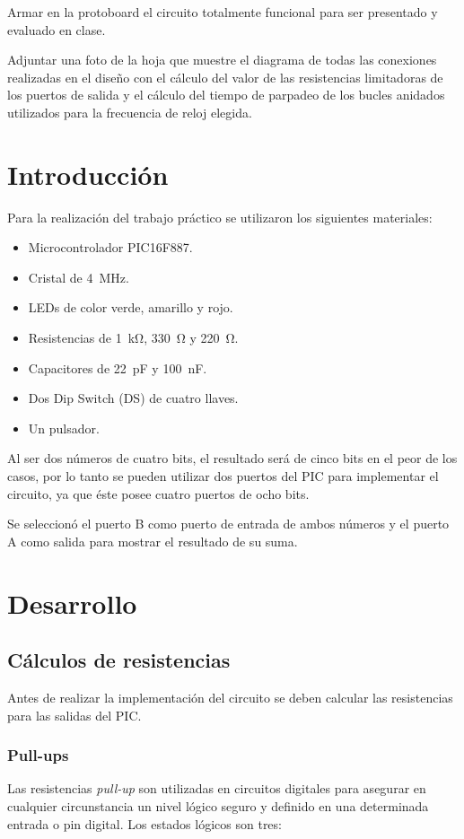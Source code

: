 \documentclass[12pt,a4paper]{article}
\begin{document}
	Armar en la protoboard el circuito totalmente funcional para ser presentado y evaluado en clase.
	
	Adjuntar una foto de la hoja que muestre el diagrama de todas las conexiones realizadas en el diseño con el cálculo del valor de las resistencias limitadoras de los puertos de salida y el cálculo del tiempo de parpadeo de los bucles anidados utilizados para la frecuencia de reloj elegida.

\newpage

\section{Introducción}
	Para la realización del trabajo práctico se utilizaron los siguientes materiales:
	
	\begin{itemize}[leftmargin=1.5cm,nosep]
	\item Microcontrolador PIC16F887.
	\item Cristal de \SI{4}{\MHz}.
	\item LEDs de color verde, amarillo y rojo.
	\item Resistencias de \SI{1}{\kilo\ohm}, \SI{330}{\ohm} y \SI{220}{\ohm}.
	\item Capacitores de \SI{22}{\pico\F} y \SI{100}{\nano\F}.
	\item Dos Dip Switch (DS) de cuatro llaves.
	\item Un pulsador.
	\end{itemize}

	Al ser dos números de cuatro bits, el resultado será de cinco bits en el peor de los casos, por lo tanto se pueden utilizar dos puertos del PIC para implementar el circuito, ya  que éste posee cuatro puertos de ocho bits.
	
	Se seleccionó el puerto B como puerto de entrada de ambos números y el puerto A como salida para mostrar el resultado de su suma.

\section{Desarrollo}
\subsection{Cálculos de resistencias}
	Antes de realizar la implementación del circuito se deben calcular las resistencias para las salidas del PIC.
	
\subsubsection{Pull-ups}
	Las resistencias \emph{pull-up} son utilizadas en circuitos digitales para asegurar en cualquier circunstancia un nivel lógico seguro y definido en una determinada entrada o pin digital. Los estados lógicos son tres:
\end{document}
